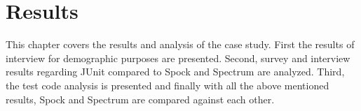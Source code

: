 \chapter{Results}
\label{chapter:results}

This chapter covers the results and analysis of the case study. First the results of interview for demographic purposes are
presented. Second, survey and interview results regarding JUnit compared to Spock and Spectrum are analyzed.  Third, the test
code analysis is presented and finally
with all the above mentioned results, Spock and Spectrum are compared against each other.



